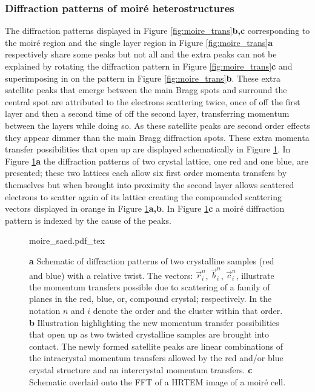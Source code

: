 \subsubsection{Diffraction patterns of moiré heterostructures}
The diffraction patterns displayed in Figure \ref{fig:moire_trans}\textbf{b,c} corresponding to the moiré region and the single layer region in Figure \ref{fig:moire_trans}\textbf{a} respectively share some peaks but not all and the extra peaks can not be explained by rotating the diffraction pattern in Figure \ref{fig:moire_trans}\textbf{c} and superimposing in on the pattern in Figure \ref{fig:moire_trans}\textbf{b}.
These extra satellite peaks that emerge between the main Bragg spots and surround the central spot are attributed to the electrons scattering twice, once of off the first layer and then a second time of off the second layer, transferring momentum between the layers while doing so. As these satellite peaks are second order effects they appear dimmer than the main Bragg diffraction spots.
These extra momenta transfer possibilities that open up are displayed schematically in Figure \ref{fig:moire_saed}. In Figure \ref{fig:moire_saed}\textbf{a} the diffraction patterns of two crystal lattice, one red and one blue, are presented; these two lattices each allow six first order momenta transfers by themselves but when brought into proximity the second layer allows scattered electrons to scatter again of its lattice creating the compounded scattering vectors displayed in orange in Figure \ref{fig:moire_saed}\textbf{a,b}. In Figure \ref{fig:moire_saed}\textbf{c} a moiré diffraction pattern is indexed by the cause of the peaks.


\begin{figure}[h]
    \centering
    \def\svgwidth{1\linewidth}
    {moire_saed.pdf_tex}
    \caption{\textbf{a} Schematic of diffraction patterns of two crystalline samples (red and blue) with a relative twist. The vectors: $\vec{r}_i^n$, $\vec{b}_i^n$, $\vec{c}_i^n$, illustrate the momentum transfers possible due to scattering of a family of planes in the red, blue, or, compound crystal; respectively. In the notation $n$ and $i$ denote the order and the cluster within that order. \textbf{b} Illustration highlighting the new momentum transfer possibilities that open up as two twisted crystalline samples are brought into contact. The newly formed satellite peaks are linear combinations of the intracrystal momentum transfers allowed by the red and/or blue crystal structure and an intercrystal momentum transfers. \textbf{c} Schematic overlaid onto the FFT of a HRTEM image of a moiré cell.}
    \label{fig:moire_saed}
\end{figure}

\clearpage
